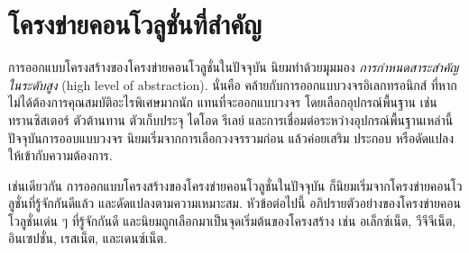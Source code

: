 %


%
%


\section{โครงข่ายคอนโวลูชั่นที่สำคัญ}

การออกแบบโครงสร้างของโครงข่ายคอนโวลูชั่นในปัจจุบัน 
นิยมทำด้วยมุุมมอง
\textit{การกำหนดสาระสำคัญในระดับสูง} (high level of abstraction).
นั่นคือ คล้ายกับการออกแบบวงจรอิเลกทรอนิกส์
ที่หากไม่ได้ต้องการคุณสมบัติอะไรพิเศษมากนัก 
แทนที่จะออกแบบวงจร
โดยเลือกอุปกรณ์พื้นฐาน เช่น ทรานซิสเตอร์ ตัวต้านทาน ตัวเก็บประจุ ไดโอด รีเลย์ และการเชื่อมต่อระหว่างอุปกรณ์พื้นฐานเหล่านี้
ปัจจุบันการออบแบบวงจร
นิยมเริ่มจากการเลือกวงจรรวมก่อน แล้วค่อยเสริม ประกอบ หรือดัดแปลง ให้เข้ากับความต้องการ.

เช่นเดียวกัน การออกแบบโครงสร้างของโครงข่ายคอนโวลูชั่นในปัจจุบัน 
ก็นิยมเริ่มจากโครงข่ายคอนโวลูชั่นที่รู้จักกันดีแล้ว และดัดแปลงตามความเหมาะสม.
หัวข้อต่อไปนี้ อภิปรายตัวอย่างของโครงข่ายคอนโวลูชั่นเด่น ๆ ที่รู้จักกันดี และนิยมถูกเลือกมาเป็นจุดเริ่มต้นของโครงสร้าง
เช่น 
อเล็กซ์เน็ต\cite{Alexnet2012},
วีจีจีเน็ต\cite{VGG2015},
อินเซปชั่น\cite{Inception2015},
เรสเน็ต\cite{He_2016_CVPR},
และเดนซ์เน็ต\cite{Densenet2017}.

